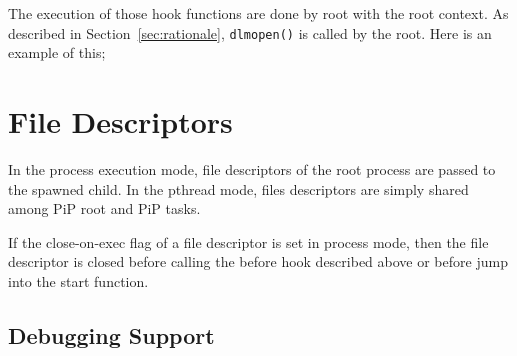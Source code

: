 The execution of those hook functions are done by root with the root
context. As described in Section~\ref{sec:rationale}, {\tt dlmopen()}
is called by the root. Here is an example of this;



\section{File Descriptors}

In the process execution mode, file descriptors of the root process
are passed to the spawned child. In the pthread mode, files
descriptors are simply shared among PiP root and PiP tasks.

If the close-on-exec flag of a file descriptor is set in process mode,
then the file descriptor is closed before calling the before hook
described above or before jump into the start function. 


\subsection{Debugging Support}
